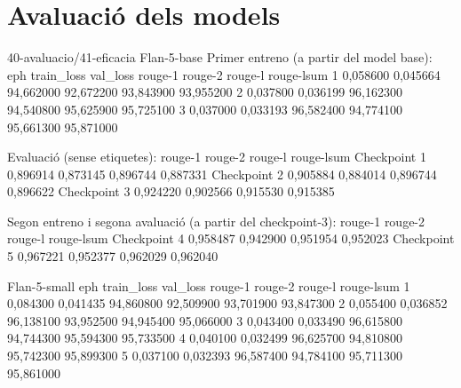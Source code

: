 \chapter{Avaluació dels models}

{40-avaluacio/41-eficacia}
Flan-5-base
Primer entreno (a partir del model base):
eph train_loss    val_loss    rouge-1      rouge-2      rouge-l      rouge-lsum
1   0,058600      0,045664    94,662000    92,672200    93,843900    93,955200
2   0,037800      0,036199    96,162300    94,540800    95,625900    95,725100
3   0,037000      0,033193    96,582400    94,774100    95,661300    95,871000

Evaluació (sense etiquetes):
                              rouge-1     rouge-2       rouge-l      rouge-lsum
Checkpoint 1                  0,896914    0,873145      0,896744     0,887331
Checkpoint 2                  0,905884    0,884014      0,896744     0,896622
Checkpoint 3                  0,924220    0,902566      0,915530     0,915385

Segon entreno i segona avaluació (a partir del checkpoint-3):
                              rouge-1     rouge-2       rouge-l      rouge-lsum
Checkpoint 4                  0,958487    0,942900      0,951954      0,952023
Checkpoint 5                  0,967221    0,952377      0,962029      0,962040



Flan-5-small
eph train_loss    val_loss    rouge-1      rouge-2      rouge-l      rouge-lsum
1   0,084300      0,041435    94,860800    92,509900    93,701900    93,847300
2   0,055400      0,036852    96,138100    93,952500    94,945400    95,066000
3   0,043400      0,033490    96,615800    94,744300    95,594300    95,733500
4   0,040100      0,032499    96,625700    94,810800    95,742300    95,899300
5   0,037100      0,032393    96,587400    94,784100    95,711300    95,861000
